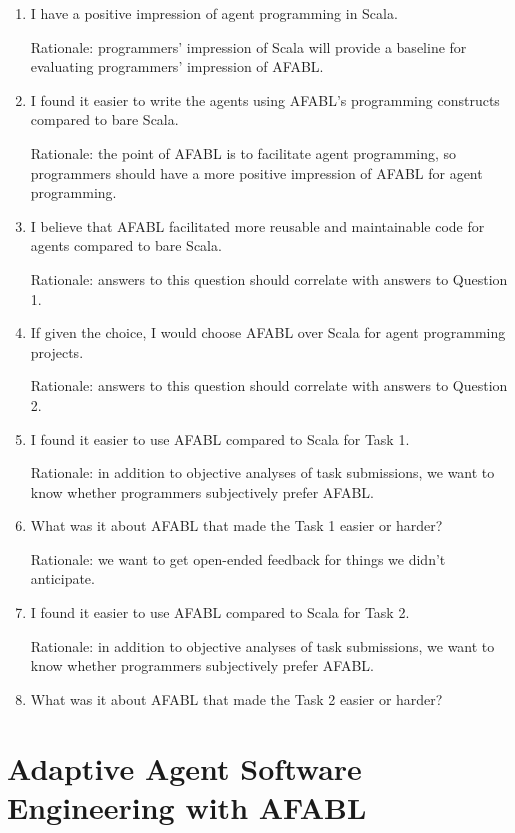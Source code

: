 \begin{enumerate}
\item I have a positive impression of agent programming in Scala.

Rationale: programmers’ impression of Scala will provide a baseline for evaluating
programmers’ impression of AFABL.

\item I found it easier to write the agents using AFABL’s programming constructs compared to bare Scala.

Rationale: the point of AFABL is to facilitate agent programming, so programmers should have a more positive impression of AFABL for agent programming.

\item I believe that AFABL facilitated more reusable and maintainable code for agents compared to bare Scala.

Rationale: answers to this question should correlate with answers to Question 1.

\item If given the choice, I would choose AFABL over Scala for agent programming projects.

Rationale: answers to this question should correlate with answers to Question 2.

\item I found it easier to use AFABL compared to Scala for Task 1.

  Rationale: in addition to objective analyses of task submissions, we want to know whether programmers subjectively prefer AFABL.

\item What was it about AFABL that made the Task 1 easier or harder?

Rationale: we want to get open-ended feedback for things we didn’t anticipate.

\item I found it easier to use AFABL compared to Scala for Task 2.

Rationale: in addition to objective analyses of task submissions, we want to know whether programmers subjectively prefer AFABL.

\item What was it about AFABL that made the Task 2 easier or harder?

\end{enumerate}

\section{Adaptive Agent Software Engineering with AFABL}

